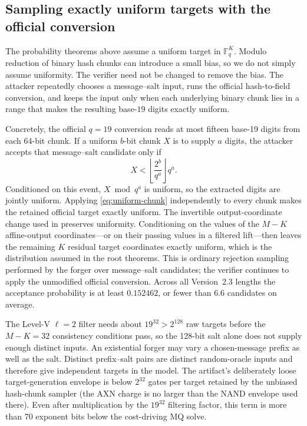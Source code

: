 \documentclass[11pt]{article}
\newcommand{\F}{\mathbb F}
\begin{document}
\subsection{Sampling exactly uniform targets with the official conversion}

The probability theorems above assume a uniform target in $\F_q^K$.
Modulo reduction of binary hash chunks can introduce a small bias, so we do
not simply assume uniformity.  The verifier need not be changed to remove the
bias.  The attacker repeatedly chooses a
message--salt input, runs the official hash-to-field conversion, and keeps the
input only when each underlying binary chunk lies in a range that makes the
resulting base-$19$ digits exactly uniform.

Concretely, the official $q=19$ conversion reads at most fifteen base-19 digits
from each 64-bit chunk.  If a uniform $b$-bit chunk $X$ is to supply $a$
digits, the attacker accepts that message--salt candidate only if
\begin{equation}\label{eq:uniform-chunk}
 X<\left\lfloor\frac{2^b}{q^a}\right\rfloor q^a.
\end{equation}
Conditioned on this event, $X\bmod q^a$ is uniform, so the extracted
digits are jointly uniform.  Applying \eqref{eq:uniform-chunk} independently
to every chunk makes the retained official target exactly uniform.  The
invertible output-coordinate change used in 
preserves uniformity.  Conditioning on the values of the $M-K$ affine-output coordinates---or on
their passing values in a filtered lift---then leaves the remaining $K$
residual target coordinates exactly uniform, which is the distribution
assumed in the root theorems.  This is
ordinary rejection sampling performed by the forger over message--salt
candidates; the verifier continues to apply the unmodified official
conversion.  Across all Version~2.3 lengths the acceptance probability is at
least $0.152462$, or fewer than 6.6 candidates on average.

The Level-V $\ell=2$ filter needs about $19^{32}>2^{128}$ raw targets before
the $M-K=32$ consistency conditions pass, so the 128-bit salt alone does not
supply enough distinct inputs.  An existential forger may vary a chosen-message
prefix as well as the salt.  Distinct prefix--salt pairs are distinct random-oracle
inputs and therefore give independent targets in the model.  The
artifact's deliberately loose target-generation envelope is below $2^{32}$
gates per target retained by the unbiased hash-chunk sampler (the AXN charge
is no larger than the NAND envelope used there).  Even after multiplication by the $19^{32}$ filtering factor,
this term is more than 70 exponent bits below the cost-driving MQ solve.
\end{document}
